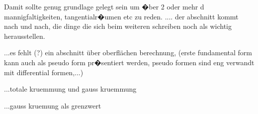 Damit sollte genug grundlage gelegt sein um �ber 2 oder mehr d mannigfaltigkeiten, tangentialr�umen etc zu reden.
.... der abschnitt kommt nach und nach, die dinge die sich beim weiteren schreiben noch als wichtig herausstellen.

...es fehlt (?) ein abschnitt über oberflächen berechnung, (erste fundamental form kann auch als pseudo form pr�sentiert werden, pseudo formen sind eng verwandt mit differential formen,...)

...totale kruemmung und gauss kruemmung

...gauss kruemung als grenzwert
